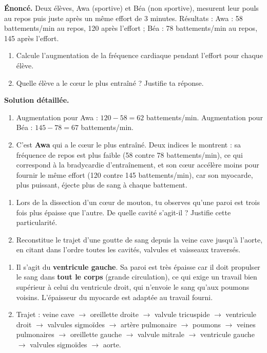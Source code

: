\documentclass[11pt]{article}
\begin{document}
\begin{exoresolu}
\textbf{Énoncé.} Deux élèves, Awa (sportive) et Béa (non sportive), mesurent leur pouls au repos puis juste après un même effort de 3 minutes. Résultats : Awa : 58 battements/min au repos, 120 après l'effort ; Béa : 78 battements/min au repos, 145 après l'effort.
\begin{enumerate}
\item Calcule l'augmentation de la fréquence cardiaque pendant l'effort pour chaque élève.
\item Quelle élève a le cœur le plus entraîné ? Justifie ta réponse.
\end{enumerate}
\tcblower
\textbf{Solution détaillée.}
\begin{enumerate}
\item Augmentation pour Awa : $120 - 58 = 62$ battements/min. Augmentation pour Béa : $145 - 78 = 67$ battements/min.
\item C'est \textbf{Awa} qui a le cœur le plus entraîné. Deux indices le montrent : sa fréquence de repos est plus faible (58 contre 78 battements/min), ce qui correspond à la bradycardie d'entraînement, et son cœur accélère moins pour fournir le même effort (120 contre 145 battements/min), car son myocarde, plus puissant, éjecte plus de sang à chaque battement.
\end{enumerate}
\end{exoresolu}

\begin{exercice}
\begin{enumerate}
\item Lors de la dissection d'un cœur de mouton, tu observes qu'une paroi est trois fois plus épaisse que l'autre. De quelle cavité s'agit-il ? Justifie cette particularité.
\item Reconstitue le trajet d'une goutte de sang depuis la veine cave jusqu'à l'aorte, en citant dans l'ordre toutes les cavités, valvules et vaisseaux traversés.
\end{enumerate}
\end{exercice}

\begin{corrige}
\begin{enumerate}
\item Il s'agit du \textbf{ventricule gauche}. Sa paroi est très épaisse car il doit propulser le sang dans \textbf{tout le corps} (grande circulation), ce qui exige un travail bien supérieur à celui du ventricule droit, qui n'envoie le sang qu'aux poumons voisins. L'épaisseur du myocarde est adaptée au travail fourni.
\item Trajet : veine cave $\rightarrow$ oreillette droite $\rightarrow$ valvule tricuspide $\rightarrow$ ventricule droit $\rightarrow$ valvules sigmoïdes $\rightarrow$ artère pulmonaire $\rightarrow$ poumons $\rightarrow$ veines pulmonaires $\rightarrow$ oreillette gauche $\rightarrow$ valvule mitrale $\rightarrow$ ventricule gauche $\rightarrow$ valvules sigmoïdes $\rightarrow$ aorte.
\end{enumerate}
\end{corrige}
\end{document}
